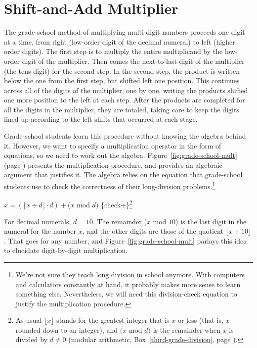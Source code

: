 \section{Shift-and-Add Multiplier}
\label{sec:bignum-mult}

The grade-school method of multiplying multi-digit numbers proceeds one digit at a time,
from right (low-order digit of the decimal numeral) to left (higher order digits).
The first step is to multiply the entire multiplicand by the low-order digit
of the multiplier.
Then comes the next-to-last digit of the multiplier (the tens digit) for the second step.
In the second step, the product is written below the one from the first step,
but shifted left one position.
This continues across all of the digits of the multiplier, one by one,
writing the products shifted one more position to the left at each step.
After the products are completed for
all the digits in the multiplier, they are totaled, taking care to keep
the digits lined up according to the left shifts that occurred at each stage.

Grade-school students learn this procedure
without knowing the algebra behind it.
However, we want to specify a
multiplication operator in the form of equations,
so we need to work out the algebra.
Figure~\ref{fig:grade-school-mult} (page \pageref{fig:grade-school-mult})
presents the multiplication procedure,
and provides an algebraic argument that justifies it.
The algebra relies on the equation
that grade-school students use to check the correctness of their long-division
problems.\footnote{We're not
sure they teach long division in school anymore.
With computers and calculators constantly at hand,
it probably makes more sense to learn something else.
Nevertheless, we will need this
division-check equation to justify the multiplication procedure.}

\hspace{2mm} $x = (\lfloor x \div d \rfloor \cdot d) + $($x$ mod $d)$ \hfill \{check$\div$\}\footnote{As
usual $\lfloor x\rfloor$ stands for the greatest integer that is $x$ or less
(that is, $x$ rounded down to an integer),
and $(x$ mod $d)$ is the remainder when $x$ is divided by $d \neq 0$ (modular arithmetic,
Box~\ref{third-grade-division}, page \pageref{third-grade-division}).}
\vspace{2mm}

For decimal numerals,  $d = 10$.
The remainder ($x$ mod $10$) is the last digit in the numeral for the number $x$,
and the other digits are those of the quotient $\lfloor x \div 10 \rfloor$.
That goes for any number, and
Figure~\ref{fig:grade-school-mult}
parlays this idea to elucidate digit-by-digit multiplication.

